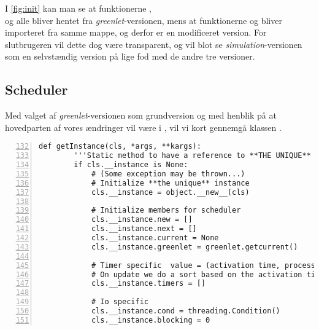 I \cref{fig:init} kan man se at funktionerne , \\ og  alle bliver hentet fra \emph{greenlet}-versionen, mens at funktionerne  og  bliver importeret fra samme mappe, og derfor er en modificeret version. For slutbrugeren  vil dette dog være transparent, og vil blot se \emph{simulation}-versionen som en selvstændig version på lige fod med de andre tre versioner.

\subsection{Scheduler}
Med valget af \emph{greenlet}-versionen som grundversion og med henblik på at hovedparten af vores ændringer vil være i \sched, vil vi kort gennemgå klassen .

\begin{lstlisting}[firstnumber=132,stepnumber=5,numbers=left, float, label=fig:scheduling, caption=Uddrag af Scheduler.py i \emph{greenlets}versionen.]
    def getInstance(cls, *args, **kargs):
        '''Static method to have a reference to **THE UNIQUE** instance'''
        if cls.__instance is None:
            # (Some exception may be thrown...)
            # Initialize **the unique** instance
            cls.__instance = object.__new__(cls)

            # Initialize members for scheduler
            cls.__instance.new = []
            cls.__instance.next = []
            cls.__instance.current = None
            cls.__instance.greenlet = greenlet.getcurrent()

            # Timer specific  value = (activation time, process)
            # On update we do a sort based on the activation time
            cls.__instance.timers = []

            # Io specific
            cls.__instance.cond = threading.Condition()
            cls.__instance.blocking = 0
\end{lstlisting}

